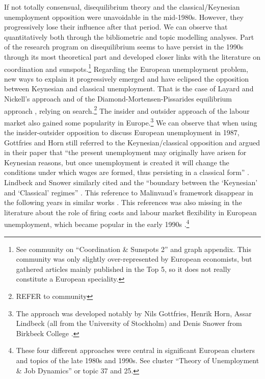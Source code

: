 \documentclass[]{elsarticle} %
\begin{document}
If not totally consensual, disequilibrium theory and the
classical/Keynesian unemployment opposition were unavoidable in the
mid-1980s. However, they progressively lose their influence after that
period. We can observe that quantitatively both through the bibliometric
and topic modelling analyses.\citep[ref to graph in appendix (cluster
and topic 11). We can also observe that indirectly in topic 25 on real
wages and employment: while][ was an important reference for the older
article of the topic, it disappeared from the bibliography of the most
recent articles (see appendix).]{malinvaud1977} Part of the research
program on disequilibrium seems to have persist in the 1990s through its
most theoretical part and developed closer links with the literature on
coordination and sunspots.\footnote{See community on ``Coordination \&
  Sunspots 2'' and graph appendix. This community was only slightly
  over-represented by European economists, but gathered articles mainly
  published in the Top 5, so it does not really constitute a European
  speciality.} Regarding the European unemployment problem, new ways to
explain it progressively emerged and have eclipsed the opposition
between Keynesian and classical unemployment. That is the case of Layard
and Nickell's approach \citep[see also][]{layard1991a} and of the
Diamond-Mortensen-Pissarides equilibrium approach
\citep{pissarides1990, mortensen1994}, relying on search.\footnote{REFER
  to community} The insider and outsider approach of the labour market
also gained some popularity in Europe.\footnote{The approach was
  developed notably by Nils Gottfries, Henrik Horn, Assar Lindbeck (all
  from the University of Stockholm) and Denis Snower from Birkbeck
  College
  \citep{gottfries1987, gottfries1992, lindbeck1986, lindbeck1987a}.} We
can observe that when using the insider-outsider opposition to discuss
European unemployment in 1987, Gottfries and Horn still referred to the
Keynesian/classical opposition and argued in their paper that ``the
present unemployment may originally have arisen for Keynesian reasons,
but once unemployment is created it will change the conditions under
which wages are formed, thus persisting in a classical form''
\citep[2]{gottfries1987}. Lindbeck and Snower similarly cited
\citet{malinvaud1977} and the ``boundary between the `Keynesian' and
`Classical' regimes'' \citep[408]{lindbeck1987a}. This reference to
Malinvaud's framework disappear in the following years in similar works
\citep[as in][ for instance]{gottfries1992}. This references was also
missing in the literature about the role of firing costs and labour
market flexibility in European unemployment, which became popular in the
early 1990s
\citep{bertola1990a, bentolila1990, bentolila1992a}.\footnote{These four
  different approaches were central in significant European clusters and
  topics of the late 1980s and 1990s. See cluster ``Theory of
  Unemployment \& Job Dynamics'' or topic 37 and 25.}
\end{document}
